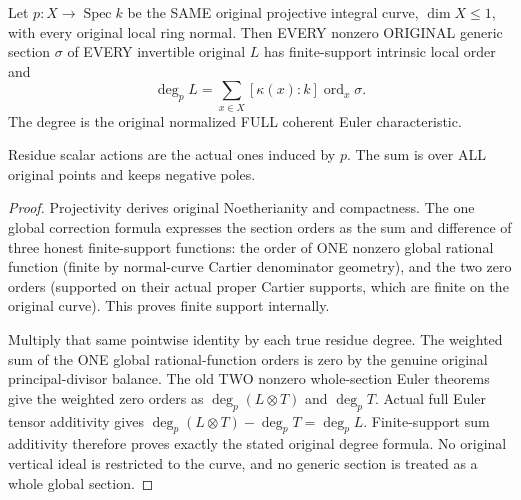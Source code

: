 \begin{theorem}
\label{thm:curve-generic-section-full-euler-degree}
\leanok
{}
Let $p:X\to\operatorname{Spec}k$ be the SAME original projective
integral curve, $\dim X\le1$, with every original local ring normal.
Then EVERY nonzero ORIGINAL generic section $\sigma$ of EVERY
invertible original $L$ has finite-support intrinsic local order and
\[
 \deg_p L=\sum_{x\in X}[\kappa(x):k]\operatorname{ord}_x\sigma.
\]
The degree is the original normalized FULL coherent Euler
characteristic.

Residue scalar actions are the actual ones induced
by $p$.  The sum is over ALL original points and keeps negative poles.
\end{theorem}
\begin{proof}
Projectivity derives original Noetherianity and compactness.  The one
global correction formula expresses the section orders as the sum
and difference of three honest finite-support functions: the order
of ONE nonzero global rational function (finite by normal-curve
Cartier denominator geometry), and the two zero orders (supported
on their actual proper Cartier supports, which are finite on the
original curve).  This proves finite support internally.

Multiply that same pointwise identity by each true residue degree.
The weighted sum of the ONE global rational-function orders is zero
by the genuine original principal-divisor balance.  The old TWO
nonzero whole-section Euler theorems give the weighted zero orders
as $\deg_p(L\otimes T)$ and $\deg_p T$.  Actual full Euler tensor
additivity gives
$\deg_p(L\otimes T)-\deg_p T=\deg_pL$.  Finite-support sum
additivity therefore proves exactly the stated original degree
formula.  No original vertical ideal is restricted to the curve,
and no generic section is treated as a whole global section.
\end{proof}
